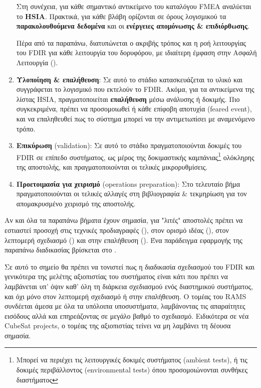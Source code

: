 \documentclass[a4paper,nobib]{tufte-book}
\begin{document}
\begin{enumerate}
	Στη συνέχεια, για κάθε σημαντικό αντικείμενο του καταλόγου \acs{FMEA} αναλύεται το \textbf{\acf{HSIA}}.\autocite{ECSS-Q-ST-30-02C} Πρακτικά, για κάθε βλάβη ορίζονται σε όρους λογισμικού τα \textbf{παρακολουθούμενα δεδομένα} και οι \textbf{ενέργειες απομόνωσης \& επιδιόρθωσης}.
	
	Πέρα από τα παραπάνω, διατυπώνεται ο ακριβής τρόπος και η ροή λειτουργίας του \acs{FDIR} για κάθε λειτουργία του δορυφόρου, με ιδιαίτερη έμφαση στην Ασφαλή Λειτουργία ().
	\label{itm:fdir_cdr}
	\item \textbf{Υλοποίηση \& επαλήθευση}: Σε αυτό το στάδιο κατασκευάζεται το υλικό και συγγράφεται το λογισμικό που εκτελούν το \acs{FDIR}. Ακόμα, για τα αντικείμενα της λίστας \acs{HSIA}, πραγματοποιείται \textbf{επαλήθευση} μέσω ανάλυσης ή δοκιμής. Πιο συγκεκριμένα, πρέπει να προσομοιωθεί ή κάθε επίφοβη αποτυχία (feared event), και να επαληθευθεί πως το σύστημα μπορεί να την αντιμετωπίσει με αναμενόμενο τρόπο.
	\label{itm:fdir_valid}
	\item \textbf{Επικύρωση} (validation): Σε αυτό το στάδιο πραγματοποιούνται δοκιμές του \acs{FDIR} σε επίπεδο συστήματος, ως μέρος της δοκιμαστικής καμπάνιας\footnote{Μπορεί να περιέχει τις λειτουργικές δοκιμές συστήματος (ambient tests), ή τις δοκιμές περιβάλλοντος (environmental tests) όπου προσομοιώνονται συνθήκες διαστήματος} ολόκληρης της αποστολής, και πραγματοποιούνται οι τελικές μικρορυθμίσεις.
	\item \textbf{Προετοιμασία για χειρισμό} (operations preparation): Στο τελευταίο βήμα πραγματοποιούνται οι τελικές αλλαγές στη βιβλιογραφία \& τεκμηρίωση για τον απομακρυσμένο χειρισμό της αποστολής.
\end{enumerate}

Αν και όλα τα παραπάνω βήματα έχουν σημασία, για "λιτές" αποστολές πρέπει να εστιαστεί προσοχή στις τεχνικές προδιαγραφές (), στον ορισμό ιδέας (), στον λεπτομερή σχεδιασμό () και στην επαλήθευση (). Ένα παράδειγμα εφαρμογής της παραπάνω διαδικασίας βρίσκεται στο .

Σε αυτό το σημείο θα πρέπει να τονιστεί πως η διαδικασία σχεδιασμού του \acs{FDIR} και γενικότερα της μελέτης αξιοπιστίας του συστήματος είναι κάτι που πρέπει να λαμβάνεται υπ' όψιν καθ' όλη τη διάρκεια σχεδιασμού ενός διαστημικού συστήματος, και όχι μόνο στον λεπτομερή σχεδιασμό ή στην επαλήθευση. Ο τομέας του \acf{RAMS} συνδέεται άμεσα με όλα τα υπόλοιπα υποσυστήματα, λαμβάνοντας τις απαραίτητες εισόδους αλλά και επηρεάζοντας σε μεγάλο βαθμό το σχεδιασμό. Ειδικότερα σε νέα CubeSat projects, ο τομέας της αξιοπιστίας τείνει να μη λαμβάνει τη δέουσα σημασία. \autocite{langer_reliability_estimation_2017}
\end{document}
